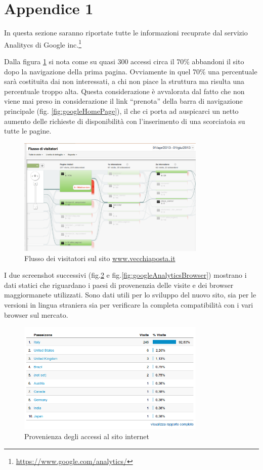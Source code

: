 \documentclass[a4paper,12pt,hidelinks]{report}
\begin{document}
\section{Appendice 1} 
\label{sec:appendice1}
  In questa sezione saranno riportate tutte le informazioni recuprate dal servizio Analitycs di Google inc.\footnote{\url{https://www.google.com/analytics/}}
  \par Dalla figura \ref{fig:googleFlusso} si nota come su quasi 300 accessi circa il 70\% abbandoni il sito dopo la navigazione della prima pagina. Ovviamente in quel 70\% una 
  percentuale sarà costituita dai non interessati, a chi non piace la struttura ma risulta una percentuale troppo alta. Questa considerazione è avvalorata dal fatto che 
  non viene mai preso in considerazione il link ``prenota'' della barra di navigazione principale (fig. \ref{fig:googleHomePage}), il che ci porta ad auspicarci un netto aumento delle richieste di
  disponibilità con l'inserimento di una scorciatoia su tutte le pagine.
  \begin{figure}[h!]%
    \includegraphics[width=0.80\textwidth,keepaspectratio=true]{../img/googleFlusso}
    \centering
    \caption{Flusso dei visitatori sul sito \url{www.vecchiaposta.it}}%
    \label{fig:googleFlusso}%
  \end{figure}
  \par I due screenshot successivi (fig.\ref{fig:googleAnalyticsPaesi} e fig.\ref{fig:googleAnalyticsBrowser}) mostrano i dati statici che riguardano i paesi di provenenzia
  delle visite e dei browser maggiormanete utilizzati. Sono dati utili per lo sviluppo del nuovo sito, sia per le versioni in lingua straniera sia per verificare
  la completa compatibilità con i vari browser sul mercato.
  \begin{figure}[h!]%
    \includegraphics[width=0.80\textwidth,keepaspectratio=true]{../img/googleAnalyticsPaesi}
    \centering
    \caption{Provenienza degli accessi al sito internet}%
    \label{fig:googleAnalyticsPaesi}%
  \end{figure}
\end{document}
